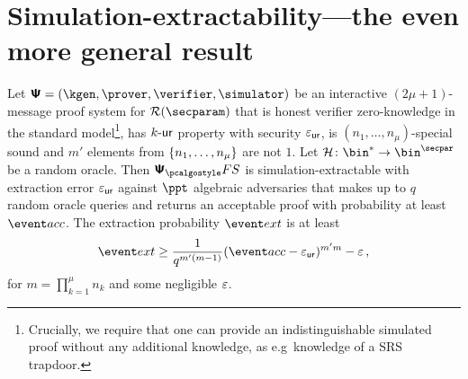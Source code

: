 \documentclass[runningheads,11pt]{llncs}
\theoremstyle{definition} \newtheorem{definition}[theorem]{Definition}
\begin{document}
\section{Simulation-extractability---the even more general result}

\begin{theorem}
\label{thm:se}
Let $\ps = (\kgen, \prover, \verifier, \simulator)$ be an interactive
$(2 \mu + 1)$-message proof system for $\RELGEN(\secparam)$ that is honest
verifier zero-knowledge in the standard model\footnote{Crucially, we require
  that one can provide an indistinguishable simulated proof without any
  additional knowledge, as e.g~knowledge of a SRS trapdoor.}, has ${k\text{-}\mathsf{ur}}$
property with security $\varepsilon_{\mathsf{ur}}$, is $(n_1, \ldots, n_\mu)$-special
sound and $m'$ elements from $\{n_1, \ldots, n_\mu\}$ are not $1$.
Let $\ro\colon \bin^{*} \to \bin^{\secpar}$ be a random oracle. 
Then $\psfs$ is simulation-extractable with extraction error $\varepsilon_{\mathsf{ur}}$
against $\ppt$ algebraic adversaries that makes up to $q$ random oracle queries and
returns an acceptable proof with probability at least $\accProb$. 
The extraction probability $\extProb$ is at least
\[
	\extProb \geq \frac{1}{q^{m'(m - 1)}} (\accProb - \epsur)^{m' m} -\eps\,,
\]
for $m = \prod_{k = 1}^{\mu} n_k$ and some negligible $\varepsilon$.	
\end{theorem}
\end{document}
